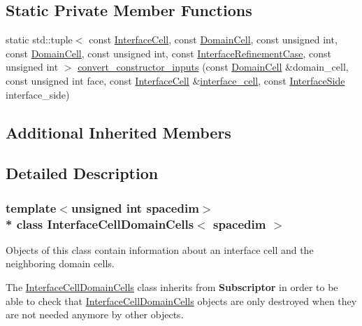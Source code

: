 \subsection*{Static Private Member Functions}
\begin{DoxyCompactItemize}
\item 
static std\+::tuple$<$ const \hyperlink{class_interface_cell_domain_cells_ac6c8ada1cde14364575ef0191a278bf8}{Interface\+Cell}, const \hyperlink{class_interface_cell_domain_cells_aea8f8f65d0f5021da9c5b8e147b6d587}{Domain\+Cell}, const unsigned int, const \hyperlink{class_interface_cell_domain_cells_aea8f8f65d0f5021da9c5b8e147b6d587}{Domain\+Cell}, const unsigned int, const \hyperlink{triangulation__system_8h_a4cfb8c5e21535951e919b6a6b1023af7}{Interface\+Refinement\+Case}, const unsigned int $>$ \hyperlink{class_interface_cell_domain_cells_a3f892a73f1f38f7412e549b9e62a8928}{convert\+\_\+constructor\+\_\+inputs} (const \hyperlink{class_interface_cell_domain_cells_aea8f8f65d0f5021da9c5b8e147b6d587}{Domain\+Cell} \&domain\+\_\+cell, const unsigned int face, const \hyperlink{class_interface_cell_domain_cells_ac6c8ada1cde14364575ef0191a278bf8}{Interface\+Cell} \&\hyperlink{class_interface_cell_domain_cells_acabc5a62be3f7742c3c334ae1777fbd5}{interface\+\_\+cell}, const \hyperlink{triangulation__system_8h_a44f3c00e36c1d6e3c389ae693c09b435}{Interface\+Side} interface\+\_\+side)
\end{DoxyCompactItemize}
\subsection*{Additional Inherited Members}


\subsection{Detailed Description}
\subsubsection*{template$<$unsigned int spacedim$>$\\*
class Interface\+Cell\+Domain\+Cells$<$ spacedim $>$}

Objects of this class contain information about an interface cell and the neighboring domain cells.

The \hyperlink{class_interface_cell_domain_cells}{Interface\+Cell\+Domain\+Cells} class inherits from {\bf Subscriptor} in order to be able to check that \hyperlink{class_interface_cell_domain_cells}{Interface\+Cell\+Domain\+Cells} objects are only destroyed when they are not needed anymore by other objects.


